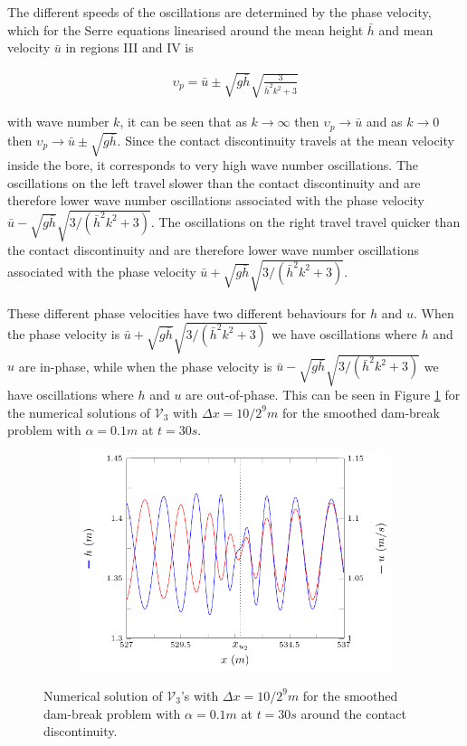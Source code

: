 \documentclass[times]{elsarticle}
\begin{document}
The different speeds of the oscillations are determined by the phase velocity, which for the Serre equations linearised around the mean height $\bar{h}$ and mean velocity $\bar{u}$ in regions III and IV is
\begin{linenomath*}
	\begin{gather}
	\upsilon_p = \bar{u} \pm \sqrt{g\bar{h}} \sqrt{\frac{3}{\bar{h}^2 k^2 + 3}}
	\end{gather}
\end{linenomath*}
with wave number $k$, it can be seen that as $k \rightarrow \infty$ then $\upsilon_p \rightarrow \bar{u}$ and as $k \rightarrow 0$ then $\upsilon_p \rightarrow \bar{u} \pm \sqrt{g\bar{h}}$. Since the contact discontinuity travels at the mean velocity inside the bore, it corresponds to very high wave number oscillations. The oscillations on the left travel slower than the contact discontinuity and are therefore lower wave number oscillations associated with the phase velocity $ \bar{u} - \sqrt{g\bar{h}} \sqrt{3/ (\bar{h}^2 k^2 + 3)}$. The oscillations on the right travel travel quicker than the contact discontinuity and are therefore lower wave number oscillations associated with the phase velocity $ \bar{u} + \sqrt{g\bar{h}} \sqrt{3/ (\bar{h}^2 k^2 + 3)}$.

These different phase velocities have two different behaviours for $h$ and $u$. When the phase velocity is $ \bar{u} + \sqrt{g\bar{h}} \sqrt{3/ (\bar{h}^2 k^2 + 3)}$ we have oscillations where $h$ and $u$ are in-phase, while when the phase velocity is $ \bar{u} - \sqrt{g\bar{h}} \sqrt{3/ (\bar{h}^2 k^2 + 3)}$ we have oscillations where $h$ and $u$ are out-of-phase. This can be seen in Figure \ref{fig:uhcomp} for the numerical solutions of $\mathcal{V}_3$ with $\Delta x = 10/2^{9}m$ for the smoothed dam-break problem with $\alpha = 0.1m$ at $t=30s$.

\begin{figure}
	\centering
	\begin{subfigure}{0.6\textwidth}\centering
		\includegraphics[width=\textwidth]{pics/results/SDB/uhcomp/uh.pdf}
	\end{subfigure}%
	\caption{Numerical solution of $\mathcal{V}_3$'s with $\Delta x = 10/2^{9}m$ for the smoothed dam-break problem with $\alpha = 0.1m$ at $t=30s$ around the contact discontinuity.}
	\label{fig:uhcomp}
\end{figure}
\end{document}
